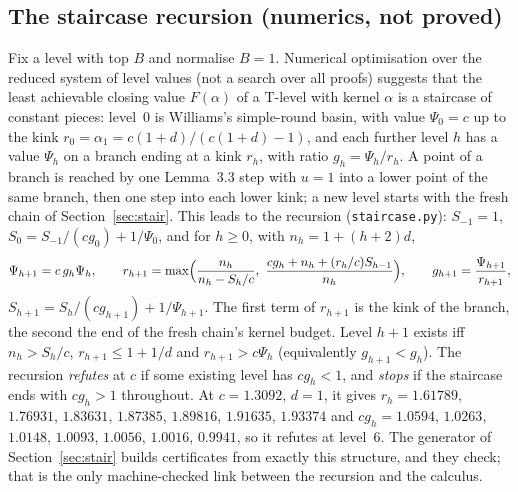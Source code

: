 \documentclass[11pt]{article}
\theoremstyle{definition}
\begin{document}
\subsection{The staircase recursion (numerics, not proved)}\label{sec:recursion}
Fix a level with top $B$ and normalise $B=1$. Numerical optimisation over the reduced system of level values (not a search over all proofs) suggests that the least achievable closing value $F(\alpha)$ of a T-level with kernel $\alpha$ is a staircase of constant pieces: level~0 is Williams's simple-round basin, with value $\Psi_0=c$ up to the kink $r_0=\alpha_1=c(1+d)/(c(1+d)-1)$, and each further level $h$ has a value $\Psi_h$ on a branch ending at a kink $r_h$, with ratio $g_h=\Psi_h/r_h$. A point of a branch is reached by one Lemma~3.3 step with $u=1$ into a lower point of the same branch, then one step into each lower kink; a new level starts with the fresh chain of Section~\ref{sec:stair}. This leads to the recursion (\texttt{staircase.py}): $S_{-1}=1$, $S_0=S_{-1}/(cg_0)+1/\Psi_0$, and for $h\ge0$, with $n_h=1+(h+2)d$,
\[\Psi_{h+1}=c\,g_h\Psi_h,\qquad r_{h+1}=\max\Bigl(\frac{n_h}{n_h-S_h/c},\ \frac{cg_h+n_h+(r_h/c)S_{h-1}}{n_h}\Bigr),\qquad g_{h+1}=\frac{\Psi_{h+1}}{r_{h+1}},\]
$S_{h+1}=S_h/(cg_{h+1})+1/\Psi_{h+1}$. The first term of $r_{h+1}$ is the kink of the branch, the second the end of the fresh chain's kernel budget. Level $h+1$ exists iff $n_h>S_h/c$, $r_{h+1}\le1+1/d$ and $r_{h+1}>c\Psi_h$ (equivalently $g_{h+1}<g_h$). The recursion \emph{refutes} at $c$ if some existing level has $cg_h<1$, and \emph{stops} if the staircase ends with $cg_h>1$ throughout. At $c=1.3092$, $d=1$, it gives $r_h=1.61789$, $1.76931$, $1.83631$, $1.87385$, $1.89816$, $1.91635$, $1.93374$ and $cg_h=1.0594$, $1.0263$, $1.0148$, $1.0093$, $1.0056$, $1.0016$, $0.9941$, so it refutes at level~6. The generator of Section~\ref{sec:stair} builds certificates from exactly this structure, and they check; that is the only machine-checked link between the recursion and the calculus.
\end{document}
